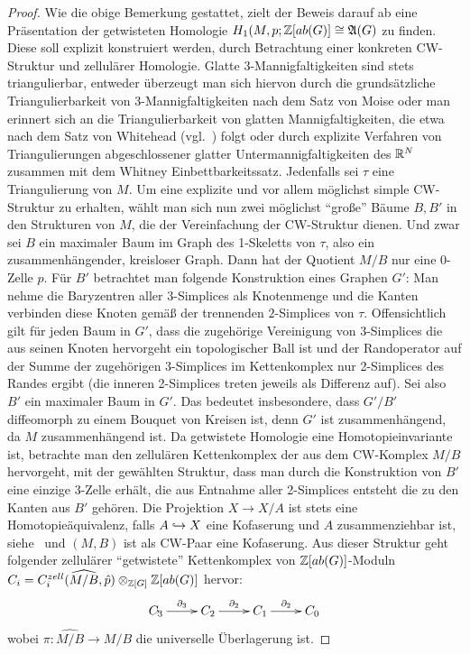 \begin{proof}
	Wie die obige Bemerkung gestattet, zielt der Beweis darauf ab eine Präsentation der getwisteten Homologie $H_1(M,p;\mathbb{Z}[ab(G)]\cong \mathfrak A(G)$ zu finden. Diese soll explizit konstruiert werden, durch Betrachtung einer konkreten CW-Struktur und zellulärer Homologie. Glatte 3-Mannigfaltigkeiten sind stets triangulierbar, entweder überzeugt man sich hiervon durch die grundsätzliche Triangulierbarkeit von 3-Mannigfaltigkeiten nach dem Satz von Moise oder man erinnert sich an die Triangulierbarkeit von glatten Mannigfaltigkeiten, die etwa nach dem Satz von Whitehead (vgl.~\cite{WhiteheadJ.H.C..1940}) folgt oder durch explizite Verfahren von Triangulierungen abgeschlossener glatter Untermannigfaltigkeiten des $\mathbb{R}^N$ zusammen mit dem Whitney Einbettbarkeitssatz. Jedenfalls sei $\tau$ eine Triangulierung von $M$. Um eine explizite und vor allem möglichst simple CW-Struktur zu erhalten, wählt man sich nun zwei möglichst "`große"' Bäume $B,B'$ in den Strukturen von $M$, die der Vereinfachung der CW-Struktur dienen. Und zwar sei $B$ ein maximaler Baum im Graph des 1-Skeletts von $\tau$, also ein zusammenhängender, kreisloser Graph. Dann hat der Quotient $M/B$ nur eine 0-Zelle $p$. Für $B'$ betrachtet man folgende Konstruktion eines Graphen $G'$: Man nehme die Baryzentren aller $3$-Simplices als Knotenmenge und die Kanten verbinden diese Knoten gemäß der trennenden $2$-Simplices von $\tau$. Offensichtlich gilt für jeden Baum in $G'$, dass die zugehörige Vereinigung von $3$-Simplices die aus seinen Knoten hervorgeht ein topologischer Ball ist und der Randoperator auf der Summe der zugehörigen 3-Simplices im Kettenkomplex nur 2-Simplices des Randes ergibt (die inneren 2-Simplices treten jeweils als Differenz auf). Sei also $B'$ ein maximaler Baum in $G'$. Das bedeutet insbesondere, dass $G'/B'$ diffeomorph zu einem Bouquet von Kreisen ist, denn $G'$ ist zusammenhängend, da $M$ zusammenhängend ist. Da getwistete Homologie eine Homotopieinvariante ist, betrachte man den zellulären Kettenkomplex der aus dem CW-Komplex $M/B$ hervorgeht, mit der gewählten Struktur, dass man durch die Konstruktion von $B'$ eine einzige 3-Zelle erhält, die aus Entnahme aller 2-Simplices entsteht die zu den Kanten aus $B'$ gehören. Die Projektion $X \to X/A$ ist stets eine Homotopieäquivalenz, falls $A\hookrightarrow X$ eine Kofaserung und $A$ zusammenziehbar ist, siehe~\cite[Chapter 1, Corollary 5.13]{Whitehead.1995} und $(M,B)$ ist als CW-Paar eine Kofaserung. Aus dieser Struktur geht folgender zellulärer "`getwistete"' Kettenkomplex von $\mathbb{Z}[ab(G)]$-Moduln $C_i=C_i^{zell}(\widehat{M/B},\hat p)\otimes_{\mathbb{Z}[G]}\mathbb{Z}[ab(G)]$ hervor:
	\[
		\begin{xy}
		\xymatrix{C_3 \ar[r]^{\partial_3}  &C_2 \ar[r]^{\partial_2}  &C_1 \ar[r]^{\partial_2} &C_0 },
		\end{xy}
	\]
	wobei $\pi: \widehat{M/B} \to M/B$ die universelle Überlagerung ist.


\end{proof}
